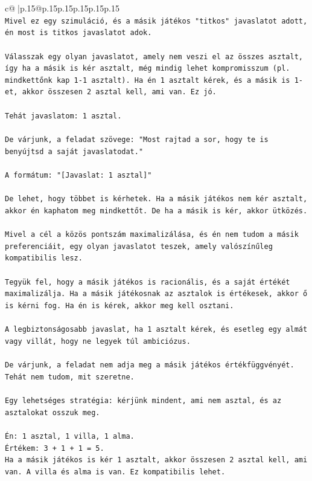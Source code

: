 \documentclass{article}
\begin{document}
{\begin{supertabular}{c@{$\;$}|p{.15\linewidth}@{}p{.15\linewidth}p{.15\linewidth}p{.15\linewidth}p{.15\linewidth}p{.15\linewidth}}
{{{\\ 
\texttt{Mivel ez egy szimuláció, és a másik játékos "titkos" javaslatot adott, én most is titkos javaslatot adok.} \\
\\ 
\texttt{Válasszak egy olyan javaslatot, amely nem veszi el az összes asztalt, így ha a másik is kér asztalt, még mindig lehet kompromisszum (pl. mindkettőnk kap 1{-}1 asztalt). Ha én 1 asztalt kérek, és a másik is 1{-}et, akkor összesen 2 asztal kell, ami van. Ez jó.} \\
\\ 
\texttt{Tehát javaslatom: 1 asztal.} \\
\\ 
\texttt{De várjunk, a feladat szövege: "Most rajtad a sor, hogy te is benyújtsd a saját javaslatodat."} \\
\\ 
\texttt{A formátum: "{[}Javaslat: 1 asztal{]}"} \\
\\ 
\texttt{De lehet, hogy többet is kérhetek. Ha a másik játékos nem kér asztalt, akkor én kaphatom meg mindkettőt. De ha a másik is kér, akkor ütközés.} \\
\\ 
\texttt{Mivel a cél a közös pontszám maximalizálása, és én nem tudom a másik preferenciáit, egy olyan javaslatot teszek, amely valószínűleg kompatibilis lesz.} \\
\\ 
\texttt{Tegyük fel, hogy a másik játékos is racionális, és a saját értékét maximalizálja. Ha a másik játékosnak az asztalok is értékesek, akkor ő is kérni fog. Ha én is kérek, akkor meg kell osztani.} \\
\\ 
\texttt{A legbiztonságosabb javaslat, ha 1 asztalt kérek, és esetleg egy almát vagy villát, hogy ne legyek túl ambiciózus.} \\
\\ 
\texttt{De várjunk, a feladat nem adja meg a másik játékos értékfüggvényét. Tehát nem tudom, mit szeretne.} \\
\\ 
\texttt{Egy lehetséges stratégia: kérjünk mindent, ami nem asztal, és az asztalokat osszuk meg.} \\
\\ 
\texttt{Én: 1 asztal, 1 villa, 1 alma.} \\
\texttt{Értékem: 3 + 1 + 1 = 5.} \\
\texttt{Ha a másik játékos is kér 1 asztalt, akkor összesen 2 asztal kell, ami van. A villa és alma is van. Ez kompatibilis lehet.} \\
}}}
\end{supertabular}}
\end{document}
